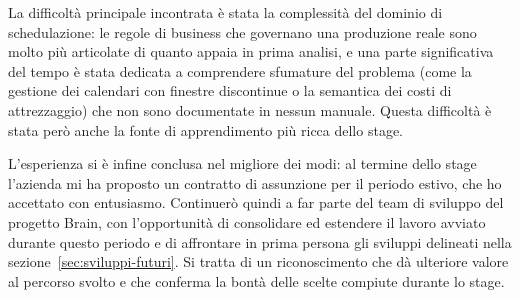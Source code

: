 La difficoltà principale incontrata è stata la complessità del dominio di schedulazione: le regole di business che governano una produzione reale sono molto più articolate di quanto appaia in prima analisi, e una parte significativa del tempo è stata dedicata a comprendere sfumature del problema (come la gestione dei calendari con finestre discontinue o la semantica dei costi di attrezzaggio) che non sono documentate in nessun manuale. Questa difficoltà è stata però anche la fonte di apprendimento più ricca dello stage.

L'esperienza si è infine conclusa nel migliore dei modi: al termine dello stage l'azienda mi ha proposto un contratto di assunzione per il periodo estivo, che ho accettato con entusiasmo. Continuerò quindi a far parte del team di sviluppo del progetto Brain, con l'opportunità di consolidare ed estendere il lavoro avviato durante questo periodo e di affrontare in prima persona gli sviluppi delineati nella sezione~\ref{sec:sviluppi-futuri}. Si tratta di un riconoscimento che dà ulteriore valore al percorso svolto e che conferma la bontà delle scelte compiute durante lo stage.

\newpage
